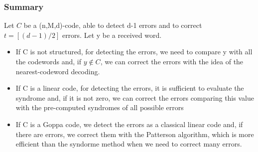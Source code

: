 \subsubsection*{Summary}
Let $C$ be a (n,M,d)-code, able to detect d-1 errors and to correct
$t = [(d-1)/2]$ errors. Let y be a received word.
\begin{itemize}
    \item If C is not structured, for detecting the errors, we need to compare y with all the codewords and, if $y \notin C$, we can correct the errors with the idea of the nearest-codeword decoding.
    \item If C is a linear code, for detecting the errors, it is sufficient to evaluate the syndrome and, if it is not zero, we can correct the errors comparing this value with the pre-computed syndromes of all possible errors
    \item If C is a Goppa code, we detect the errors as a classical linear code and, if there are errors, we correct them with the Patterson algorithm, which is more efficient than the syndorme method when we need to correct many errors.
\end{itemize}


